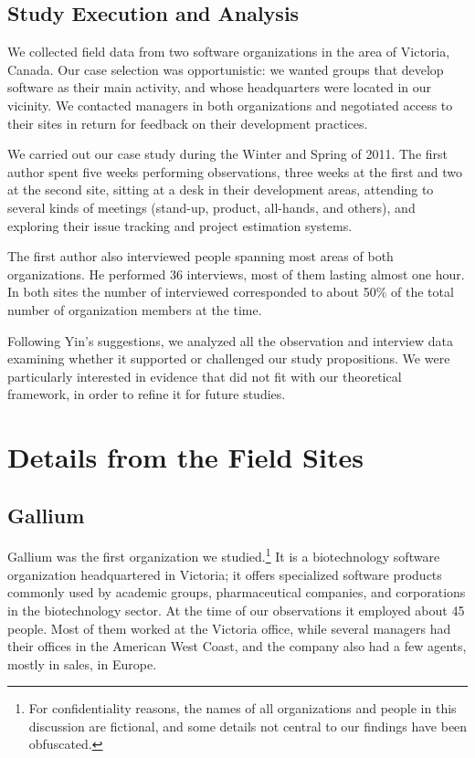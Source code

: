 \documentclass[10pt, conference, compsocconf]{IEEEtran}
\begin{document}
\subsection{Study Execution and Analysis}

We collected field data from two software organizations in the area of Victoria, Canada. Our case selection was opportunistic: we wanted groups that develop software as their main activity, and whose headquarters were located in our vicinity. We contacted managers in both organizations and negotiated access to their sites in return for feedback on their development practices.

We carried out our case study during the Winter and Spring of 2011. The first author spent five weeks performing observations, three weeks at the first and two at the second site, sitting at a desk in their development areas, attending to several kinds of meetings (stand-up, product, all-hands, and others), and exploring their issue tracking and project estimation systems.

The first author also interviewed people spanning most areas of both organizations. He performed 36 interviews, most of them lasting almost one hour. In both sites the number of interviewed corresponded to about 50\% of the total number of organization members at the time.

Following Yin's \cite{Yin2003} suggestions, we analyzed all the observation and interview data examining whether it supported or challenged our study propositions. We were particularly interested in evidence that did not fit with our theoretical framework, in order to refine it for future studies.




\section{Details from the Field Sites}

\subsection{Gallium}

Gallium was the first organization we studied.\footnote{For confidentiality reasons, the names of all organizations and people in this discussion are fictional, and some details not central to our findings have been obfuscated.} It is a biotechnology software organization headquartered in Victoria; it offers specialized software products commonly used by academic groups, pharmaceutical companies, and corporations in the biotechnology sector. At the time of our observations it employed about 45 people. Most of them worked at the Victoria office, while several managers had their offices in the American West Coast, and the company also had a few agents, mostly in sales, in Europe.
\end{document}
